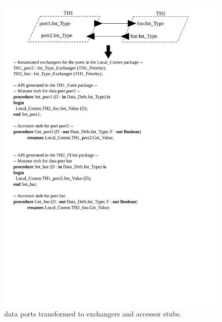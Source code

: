\begin{figure}
\centering
\includegraphics[scale=0.5]{figs/dataports}
\caption{\aadl data ports transformed to exchangers and accessor
  stubs.}
\label{fig:dataports}
\end{figure}

